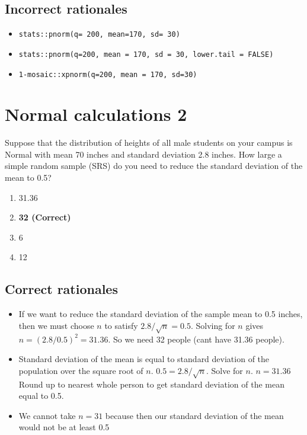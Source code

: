 \documentclass[letterpaper,12pt,twoside,printwatermark=false]{pinp}
\providecommand{\tightlist}{%
  \setlength{\itemsep}{0pt}\setlength{\parskip}{0pt}}
\begin{document}
\hypertarget{incorrect-rationales}{%
\subsection{Incorrect rationales}\label{incorrect-rationales}}

\begin{itemize}
\tightlist
\item
  \texttt{stats::pnorm(q=\ 200,\ mean=170,\ sd=\ 30)}
\item
  \texttt{stats::pnorm(q=200,\ mean\ =\ 170,\ sd\ =\ 30,\ lower.tail\ =\ FALSE)}
\item
  \texttt{1-mosaic::xpnorm(q=200,\ mean\ =\ 170,\ sd=30)}
\end{itemize}

\hypertarget{normal-calculations-2}{%
\section{Normal calculations 2}\label{normal-calculations-2}}

Suppose that the distribution of heights of all male students on your
campus is Normal with mean 70 inches and standard deviation 2.8 inches.
How large a simple random sample (SRS) do you need to reduce the
standard deviation of the mean to 0.5?

\begin{enumerate}
\def\labelenumi{\alph{enumi}.}
\tightlist
\item
  31.36
\item
  \textbf{32 (Correct)}
\item
  6
\item
  12
\end{enumerate}

\hypertarget{correct-rationales-1}{%
\subsection{Correct rationales}\label{correct-rationales-1}}

\begin{itemize}
\tightlist
\item
  If we want to reduce the standard deviation of the sample mean to 0.5
  inches, then we must choose \(n\) to satisfy \(2.8/ \sqrt{n} = 0.5\).
  Solving for \(n\) gives \(n = (2.8/0.5)^2 = 31.36\). So we need 32
  people (cant have 31.36 people).
\item
  Standard deviation of the mean is equal to standard deviation of the
  population over the square root of \(n\). \(0.5 = 2.8 / \sqrt{n}\).
  Solve for \(n\). \(n = 31.36\) Round up to nearest whole person to get
  standard deviation of the mean equal to 0.5.
\item
  We cannot take \(n=31\) because then our standard deviation of the
  mean would not be at least 0.5
\end{itemize}
\end{document}
